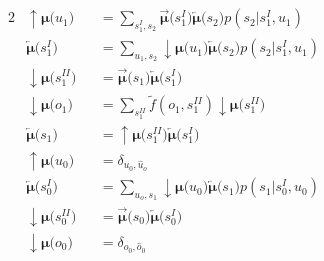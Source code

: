 \documentclass[fleqn]{article}
\begin{document}
\begin{minipage}[t]{0.5\textwidth}
    \begin{alignat}{2}
         & \bm{{\uparrow}{\mu}(}u_1\bm{)}                                   &  & = \sum_{s^{\scriptscriptstyle I}_1, s_2} \bm{\overrightarrow{\mu}(}s^{\scriptscriptstyle I}_1\bm{)} \bm{\overleftarrow{\mu}(}s_2\bm{)} p(s_2|{s^{\scriptscriptstyle I}_1},u_1) \\
         & \bm{\overleftarrow{\mu}(}s^{\scriptscriptstyle I}_1\bm{)}        &  & = \sum_{u_1, s_2} \bm{{\downarrow}{\mu}(}u_1\bm{)} \bm{\overleftarrow{\mu}(}s_2\bm{)} p(s_2|s^{\scriptscriptstyle I}_1,u_1)                                                    \\
         & \bm{{\downarrow}{\mu}(}s^{\scriptscriptstyle II}_1\bm{)}         &  & = \bm{\overrightarrow{\mu}(}s_1\bm{)} \bm{\overleftarrow{\mu}(}s^{\scriptscriptstyle I}_1\bm{)}                                                                                \\
         & \bm{{\downarrow}{\mu}(}o_1\bm{)}                                 &  & = \sum_{s^{\scriptscriptstyle II}_1} \tilde{f}(o_1,s^{\scriptscriptstyle II}_1) \bm{{\downarrow}{\mu}(}s^{\scriptscriptstyle II}_1\bm{)}                                       \\
         & \bm{\overleftarrow{\mu}(}s_1\bm{)}                               &  & = \bm{{\uparrow}{\mu}(}s^{\scriptscriptstyle II}_1\bm{)} \bm{\overleftarrow{\mu}(}s^{\scriptscriptstyle I}_1\bm{)}                                                             \\
         & \bm{{\uparrow}{\mu}(}u_0\bm{)}                                   &  & = \delta_{u_0, \hat{u}_o}                                                                                                                                                      \\
         & \bm{\overleftarrow{\mu}(}s^{\scriptscriptstyle I}_0\bm{)}        &  & = \sum_{u_o, s_1} \bm{{\downarrow}{\mu}(}u_0\bm{)} \bm{\overleftarrow{\mu}(}s_1\bm{)} p(s_1|s^{\scriptscriptstyle I}_0,u_0)                                                    \\
         & \bm{{\downarrow}{\mu}(}s^{\scriptscriptstyle II}_0\bm{)}         &  & = \bm{\overrightarrow{\mu}(}s_0\bm{)} \bm{\overleftarrow{\mu}(}s^{\scriptscriptstyle I}_0\bm{)}                                                                                \\
         & \bm{{\downarrow}{\mu}(}o_0\bm{)}                                 &  & = \delta_{o_0, \hat{o}_0}                                      \\

\end{alignat}
\end{minipage}
\end{document}
